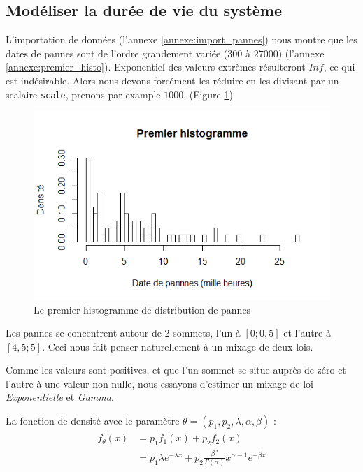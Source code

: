\documentclass[10pt,a4paper]{article}
\begin{document}
\subsection{Modéliser la durée de vie du système}
L'importation de données (l'annexe \ref{annexe:import_pannes}) nous montre que les dates de pannes sont de l'ordre grandement variée ($300$ à $27000$) (l'annexe \ref{annexe:premier_histo}). Exponentiel des valeurs extrèmes résulteront $Inf$, ce qui est indésirable. Alors nous devons forcément les réduire en les divisant par un scalaire \texttt{scale}, prenons par example $1000$.  (Figure \ref{histo1})
\begin{figure}[!htb]
    \centering
    \includegraphics[width=\textwidth]{premier_histo.png}
    \caption{Le premier histogramme de distribution de pannes}
    \label{histo1}
\end{figure}

Les pannes se concentrent autour de 2 sommets, l'un à $[0; 0,5]$ et l'autre à $[4,5; 5]$. Ceci nous fait penser naturellement à un mixage de deux lois.

Comme les valeurs sont positives, et que l'un sommet se situe auprès de zéro et l'autre à une valeur non nulle, nous essayons d'estimer un mixage de loi \emph{Exponentielle} et \emph{Gamma}.

La fonction de densité avec le paramètre $\theta  = \left( {p_1, p_2, \lambda ,\alpha ,\beta } \right)$ :
\begin{align}
    \begin{split}
        \label{fMelExpGam}
        {f_\theta }\left( x \right) & = {p_1}{f_1}\left( x \right) + {p_2}{f_2}\left( x \right) \\
        & = {p_1}\lambda {e^{ - \lambda x}} + {p_2}\frac{{{\beta ^\alpha }}}{{\Gamma \left( \alpha  \right)}}{x^{\alpha  - 1}}{e^{ - \beta x}}
    \end{split}
\end{align}
\end{document}

